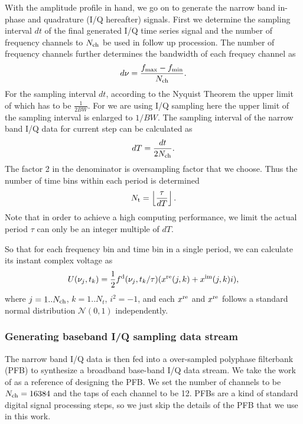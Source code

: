 \documentclass[fleqn,usenatbib]{mnras}
\begin{document}
With the amplitude profile in hand, we go on to generate the narrow band in-phase and quadrature (I/Q hereafter) signals.
First we determine the sampling interval $dt$ of the final generated I/Q time series signal and the number of frequency channels to $N_{\rm ch}$ be used in follow up procession.
The number of frequency channels further determines the bandwidth of each frequey channel as
\begin{gather}
    d\nu=\frac{f_{\max}-f_{\min}}{N_{\rm ch}}.
\end{gather}
For the sampling interval $dt$, according to the Nyquist Theorem the upper limit of which has to be $\frac{1}{2BW}$. 
For we are using I/Q sampling here the upper limit of the sampling interval is enlarged to $1/BW$.
The sampling interval of the narrow band I/Q data for current step can be calculated as
\begin{gather}
 dT=\frac{dt}{2N_{\rm ch}}.
\end{gather}
The factor 2 in the denominator is oversampling factor that we choose.
Thus the number of time bins within each period is determined 
\begin{gather}
 N_{\rm t}=\left\lfloor\frac{\tau}{dT}\right\rfloor.
\end{gather}
Note that in order to achieve a high computing performance, we limit the actual period $\tau$ can only be an integer multiple of $dT$.

So that for each frequency bin and time bin in a single period, we can calculate its instant complex voltage as
\begin{gather}
    U(\nu_{j}, t_{k})=\frac{1}{2}f^{\rm d}(\nu_j, t_{k}/\tau)(x^{\rm re}(j,k)+x^{\rm im}(j,k)i),
\end{gather}
where $j=1..N_{\rm ch}$, $k=1..N_{t}$, $i^2=-1$, and each $x^{\rm re}$ and $x^{\rm re}$ follows a standard normal distribution $\mathcal{N}(0,1)$ independently.

\subsubsection{Generating baseband I/Q sampling data stream}

The narrow band I/Q data is then fed into a over-sampled polyphase filterbank (PFB) to synthesize a broadband base-band I/Q data stream.
We take the work of \citet{2020JAI.....950004M} as a reference of designing the PFB.
We set the number of channels to be $N_{\rm ch}=16384$ and the taps of each channel to be 12.
PFBs are a kind of standard digital signal processing steps, so we just skip the details of the PFB that we use in this work.
\end{document}
